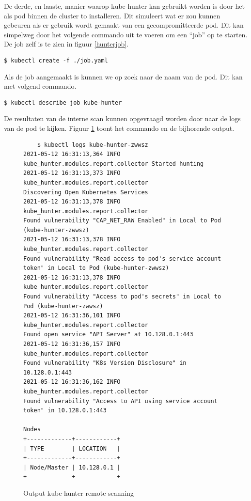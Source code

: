 De derde, en laaste, manier waarop kube-hunter kan gebruikt worden is door het als pod binnen de cluster to installeren. Dit simuleert wat er zou kunnen gebeuren als er gebruik wordt gemaakt van een gecompromitteerde pod. Dit kan simpelweg door het volgende commando uit te voeren om een ``job'' op te starten. De job zelf is te zien in figuur \ref{hunterjob}.

\begin{verbatim} 
$ kubectl create -f ./job.yaml
\end{verbatim}

Als de job aangemaakt is kunnen we op zoek naar de naam van de pod. Dit kan met volgend commando.
\begin{verbatim} 
$ kubectl describe job kube-hunter
\end{verbatim}

De resultaten van de interne scan kunnen opgevraagd worden door naar de logs van de pod te kijken. Figuur \ref{hunterOut} toont het commando en de bijhorende output.
\begin{figure}[h] 
	\centering
	\begin{verbatim} 
	$ kubectl logs kube-hunter-zwwsz
2021-05-12 16:31:13,364 INFO kube_hunter.modules.report.collector Started hunting
2021-05-12 16:31:13,373 INFO kube_hunter.modules.report.collector 
Discovering Open Kubernetes Services
2021-05-12 16:31:13,378 INFO kube_hunter.modules.report.collector 
Found vulnerability "CAP_NET_RAW Enabled" in Local to Pod (kube-hunter-zwwsz)
2021-05-12 16:31:13,378 INFO kube_hunter.modules.report.collector 
Found vulnerability "Read access to pod's service account token" in Local to Pod (kube-hunter-zwwsz)
2021-05-12 16:31:13,378 INFO kube_hunter.modules.report.collector 
Found vulnerability "Access to pod's secrets" in Local to Pod (kube-hunter-zwwsz)
2021-05-12 16:31:36,101 INFO kube_hunter.modules.report.collector 
Found open service "API Server" at 10.128.0.1:443
2021-05-12 16:31:36,157 INFO kube_hunter.modules.report.collector 
Found vulnerability "K8s Version Disclosure" in 10.128.0.1:443
2021-05-12 16:31:36,162 INFO kube_hunter.modules.report.collector 
Found vulnerability "Access to API using service account token" in 10.128.0.1:443

Nodes
+-------------+------------+
| TYPE        | LOCATION   |
+-------------+------------+
| Node/Master | 10.128.0.1 |
+-------------+------------+
	\end{verbatim}
	\caption{Output kube-hunter remote scanning}
	\label{hunterOut}
\end{figure}

